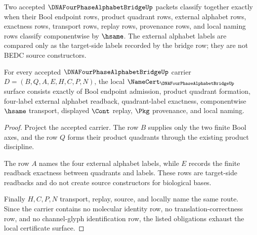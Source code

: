 \begin{definition}
\label{def:dna-four-phase-alphabet-bridge-classifier}
Two accepted $\DNAFourPhaseAlphabetBridgeUp$ packets classify together exactly when their Bool endpoint rows, product quadrant rows, external alphabet rows, exactness rows, transport rows, replay rows, provenance rows, and local naming rows classify componentwise by $\hsame$.
The external alphabet labels are compared only as the target-side labels recorded by the bridge row; they are not BEDC source constructors.
\end{definition}

\begin{theorem}
\label{thm:dna-four-phase-alphabet-bridge-namecert-obligations}
For every accepted $\DNAFourPhaseAlphabetBridgeUp$ carrier $D=(B,Q,A,E,H,C,P,N)$, the local $\NameCert_{\DNAFourPhaseAlphabetBridgeUp}$ surface consists exactly of Bool endpoint admission, product quadrant formation, four-label external alphabet readback, quadrant-label exactness, componentwise $\hsame$ transport, displayed $\Cont$ replay, $\Pkg$ provenance, and local naming.
\end{theorem}
\begin{proof}
Project the accepted carrier. The row $B$ supplies only the two finite Bool axes, and the row $Q$ forms their product quadrants through the existing product discipline.

The row $A$ names the four external alphabet labels, while $E$ records the finite readback exactness between quadrants and labels. These rows are target-side readbacks and do not create source constructors for biological bases.

Finally $H,C,P,N$ transport, replay, source, and locally name the same route. Since the carrier contains no molecular identity row, no translation-correctness row, and no channel-glyph identification row, the listed obligations exhaust the local certificate surface.
\end{proof}

